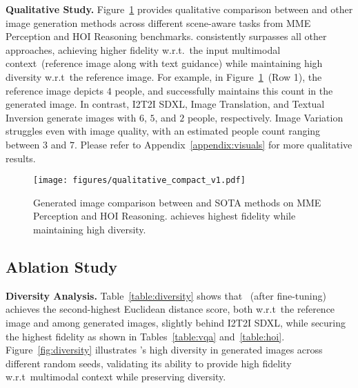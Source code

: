 \textbf{Qualitative Study.}  Figure~\ref{fig:qualitative} provides qualitative comparison between \method and other image generation methods across different scene-aware tasks from MME Perception and HOI Reasoning benchmarks. \method consistently surpasses all other approaches, achieving higher fidelity w.r.t.~the input multimodal context~(reference image along with text guidance) while maintaining high diversity w.r.t~the reference image. For example, in Figure~\ref{fig:qualitative}~(Row 1), the reference image depicts $4$ people, and \method successfully maintains this count in the generated image. In contrast, I2T2I SDXL, Image Translation, and Textual Inversion generate images with $6$, $5$, and $2$ people, respectively. Image Variation struggles even with image quality, with an estimated people count ranging between $3$ and $7$. Please refer to Appendix~\ref{appendix:visuals} for more qualitative results.

\begin{figure}[!t]
\vspace{-1mm}
    \centering
\texttt{[image: figures/qualitative\_compact\_v1.pdf]}
    \vspace{-6mm}
    \caption{Generated image comparison between \method and SOTA methods on MME Perception and HOI Reasoning. \method achieves highest fidelity while maintaining high diversity.}
    \label{fig:qualitative}
    \vspace{-4mm}
\end{figure}



\subsection{Ablation Study}
\textbf{Diversity Analysis.} Table~\ref{table:diversity} shows that \method~(after fine-tuning) achieves the second-highest Euclidean distance score, both w.r.t~the reference image and among generated images, slightly behind I2T2I SDXL, while securing the highest fidelity as shown in Tables~\ref{table:vqa} and~\ref{table:hoi}. Figure~\ref{fig:diversity} illustrates \method's high diversity in generated images across different random seeds, validating its ability to provide high fidelity w.r.t~multimodal context while preserving diversity.

